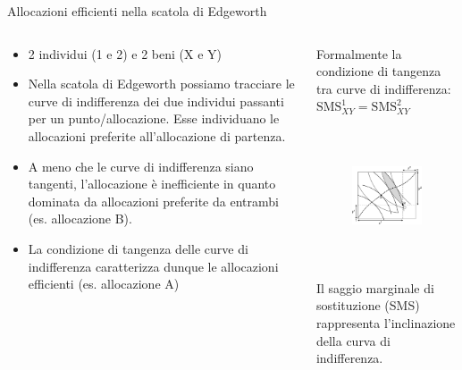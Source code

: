 \documentclass[aspectratio=149,11pt]{beamer}
\begin{document}
\begin{frame}{Allocazioni efficienti nella scatola di Edgeworth}
\begin{columns}
\begin{column}{.5\columnwidth}
\fontsize{11}{11}\selectfont
\begin{itemize}
\item 2 individui (1 e 2) e 2 beni (X e Y)
\item Nella scatola di Edgeworth possiamo tracciare le curve di indifferenza dei due individui passanti per un punto/allocazione. Esse individuano le allocazioni preferite all’allocazione di partenza.
\item A meno che le curve di indifferenza siano tangenti, l’allocazione è inefficiente in quanto dominata da allocazioni preferite da entrambi (es. allocazione B).
\item La condizione di tangenza delle curve di indifferenza caratterizza dunque le allocazioni efficienti (es. allocazione A)
\end{itemize}
\end{column}
\begin{column}{.5\columnwidth}
\footnotesize
Formalmente la condizione di tangenza
tra curve di indifferenza: $\text{SMS}^1_{XY}=\text{SMS}^2_{XY}$

\begin{figure}
\centering
\includegraphics[height=4cm]{./figure/edgeworth-1.pdf}
\end{figure}

Il saggio marginale di sostituzione (SMS) rappresenta l’inclinazione della curva di indifferenza. 
\end{column}
\end{columns}
\end{frame}
\end{document}
